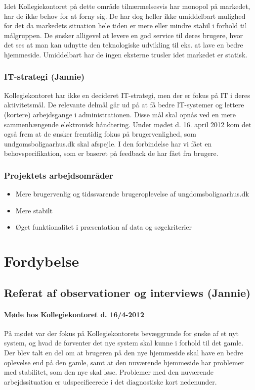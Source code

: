 \documentclass[12pt, a4paper]{report}
\begin{document}
Idet Kollegiekontoret på dette område tilnærmelsesvis har monopol på markedet, har de ikke behov for at forny sig. De har dog heller ikke umiddelbart mulighed for det da markedets situation hele tiden er mere eller mindre stabil i forhold til målgruppen. De ønsker alligevel at levere en god service til deres brugere, hvor det ses at man kan udnytte den teknologiske udvikling til eks. at lave en bedre hjemmeside. Umiddelbart har de ingen eksterne trusler idet markedet er statisk.

  \subsubsection{IT-strategi (Jannie)}
Kollegiekontoret har ikke en decideret IT-strategi, men der er fokus på IT i deres aktivitetsmål. De relevante delmål går ud på at få bedre IT-systemer og lettere (kortere) arbejdsgange i administrationen. Disse mål skal opnås ved en mere sammenhængende elektronisk håndtering. Under mødet d. 16. april 2012 kom det også frem at de ønsker fremtidig fokus på brugervenlighed, som undgomsboligaarhus.dk skal afspejle. I den forbindelse har vi fået en behovspecifikation, som er baseret på feedback de har fået fra brugere.

\subsubsection{Projektets arbejdsområder}
\begin{itemize}
\item Mere brugervenlig og tidssvarende brugeroplevelse af ungdomsboligaarhus.dk
\item Mere stabilt
\item Øget funktionalitet i præsentation af data og søgekriterier
\end{itemize}

\section{Fordybelse}
\subsection{Referat af observationer og interviews (Jannie)}
\paragraph{Møde hos Kollegiekontoret d. 16/4-2012}
På mødet var der fokus på Kollegiekontorets bevæggrunde for ønske af et nyt system, og hvad de forventer det nye system skal kunne i forhold til det gamle. Der blev talt en del om at brugeren på den nye hjemmeside skal have en bedre oplevelse end på den gamle, samt at den nuværende hjemmeside har problemer med stabilitet, som den nye skal løse. Problemer med den nuværende arbejdssituation er udspecificerede i det diagnostiske kort nedenunder.
\end{document}
